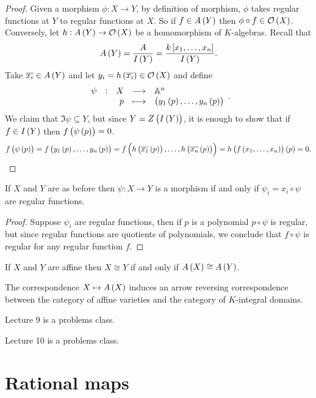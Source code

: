 \begin{proof}
Given a morphism $ \phi : X \to Y $, by definition of morphism, $ \phi $ takes regular functions at $ Y $ to regular functions at $ X $. So if $ f \in A\br{Y} $ then $ \phi \circ f \in \OOO\br{X} $. Conversely, let $ h : A\br{Y} \to \OOO\br{X} $ be a homomorphism of $ K $-algebras. Recall that
$$ A\br{Y} = \dfrac{A}{I\br{Y}} = \dfrac{k\sbr{x_1, \dots, x_n}}{I\br{Y}}. $$
Take $ \overline{x_i} \in A\br{Y} $ and let $ y_i = h\br{\overline{x_i}} \in \OOO\br{X} $ and define
$$ \function[\psi]{X}{\AA^n}{p}{\br{y_1\br{p}, \dots, y_n\br{p}}}. $$
We claim that $ \Im \psi \subseteq Y $, but since $ Y = Z\br{I\br{Y}} $, it is enough to show that if $ f \in I\br{Y} $ then $ f\br{\psi\br{p}} = 0 $.
$$ f\br{\psi\br{p}} = f\br{y_1\br{p}, \dots, y_n\br{p}} = f\br{h\br{\overline{x_1}\br{p}}, \dots, h\br{\overline{x_n}\br{p}}} = h\br{f\br{x_1, \dots, x_n}}\br{p} = 0. $$
\end{proof}

\begin{lemma}
If $ X $ and $ Y $ are as before then $ \psi : X \to Y $ is a morphism if and only if $ \psi_i = x_i \circ \psi $ are regular functions.
\end{lemma}

\begin{proof}
Suppose $ \psi_i $ are regular functions, then if $ p $ is a polynomial $ p \circ \psi $ is regular, but since regular functions are quotients of polynomials, we conclude that $ f \circ \psi $ is regular for any regular function $ f $.
\end{proof}

\begin{corollary}
If $ X $ and $ Y $ are affine then $ X \cong Y $ if and only if $ A\br{X} \cong A\br{Y} $.
\end{corollary}

\begin{corollary}
The correspondence $ X \mapsto A\br{X} $ induces an arrow reversing correspondence between the category of affine varieties and the category of $ K $-integral domains.
\end{corollary}


Lecture 9 is a problems class.


Lecture 10 is a problems class.

\pagebreak

\section{Rational maps}

